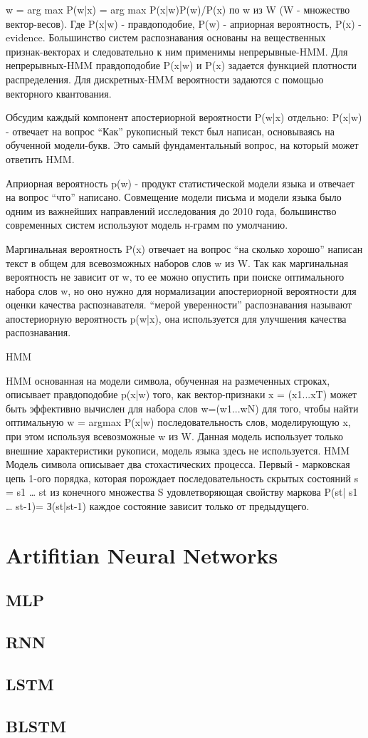 w = arg max P(w|x) = arg max P(x|w)P(w)/P(x) по w из W (W - множество вектор-весов).
Где P(x|w) - правдоподобие, P(w) - априорная вероятность, P(x) - evidence.
Большинство систем распознавания основаны на вещественных признак-векторах и следовательно к ним применимы непрерывные-HMM. Для непрерывных-HMM правдоподобие P(x|w) и P(x) задается функцией плотности распределения. Для дискретных-HMM вероятности задаются с помощью векторного квантования.

Обсудим каждый компонент апостериорной вероятности P(w|x) отдельно:
P(x|w) - отвечает на вопрос “Как” рукописный текст был написан, основываясь на обученной модели-букв. Это самый фундаментальный вопрос, на который может ответить HMM.

Априорная вероятность p(w) - продукт статистической модели языка и отвечает на вопрос “что” написано. Совмещение модели письма и модели языка было одним из важнейших направлений исследования до 2010 года, большинство современных систем используют модель н-грамм по умолчанию.

Маргинальная вероятность P(x) отвечает на вопрос “на сколько хорошо” написан текст в общем для всевозможных наборов слов w из W. Так как маргинальная вероятность не зависит от w, то ее можно опустить при поиске оптимального набора слов w, но оно нужно для нормализации апостериорной вероятности для оценки качества распознавателя. “мерой уверенности” распознавания называют апостериорную вероятность p(w|x), она используется для улучшения качества распознавания.

HMM

HMM основанная на модели символа, обученная на размеченных строках, описывает правдоподобие p(x|w) того, как вектор-признаки x = (x1...xT) может быть эффективно вычислен для набора слов w=(w1...wN) для того, чтобы найти оптимальную w = argmax P(x|w) последовательность слов, моделирующую x, при этом используя всевозможные w из W. Данная модель использует только внешние характеристики рукописи, модель языка здесь не используется.
HMM Модель символа описывает два стохастических процесса.  Первый - марковская цепь 1-ого порядка, которая порождает последовательность скрытых состояний s = s1 … st из конечного множества S  удовлетворяющая свойству маркова P(st| s1 … st-1)= З(st|st-1) каждое состояние зависит только от предыдущего.



\section{Artifitian Neural Networks} \label{sect3_4}

\subsection{MLP} \label{sect3_4}

\subsection{RNN} \label{sect3_4}

\subsection{LSTM} \label{sect3_4_1}

\subsection{BLSTM} \label{sect3_4_2}
